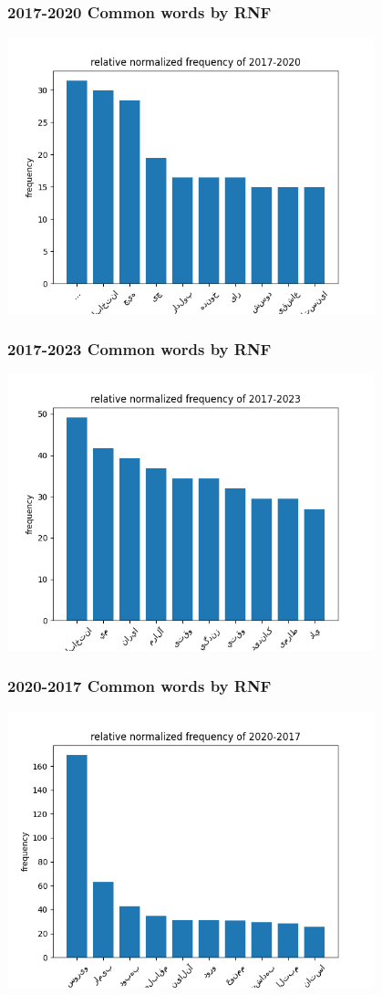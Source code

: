 \documentclass[a4paper]{article}
\begin{document}
\subsubsection{2017-2020 Common words by RNF}
\includegraphics[width=0.8\textwidth]{../stats/RNF/rnf17_20.png}
\subsubsection{2017-2023 Common words by RNF}
\includegraphics[width=0.8\textwidth]{../stats/RNF/rnf17_23.png}
\subsubsection{2020-2017 Common words by RNF}
\includegraphics[width=0.8\textwidth]{../stats/RNF/rnf20_17.png}
\end{document}
